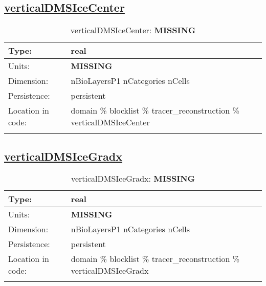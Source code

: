 \subsection[verticalDMSIceCenter]{\hyperref[sec:var_tab_tracer_reconstruction]{verticalDMSIceCenter}}
\label{subsec:var_sec_tracer_reconstruction_verticalDMSIceCenter}
\begin{center}
\begin{longtable}{| p{2.0in} | p{4.0in} |}
        \hline 
        Type: & real \\
        \hline 
        Units: & {\bf \color{red} MISSING} \\
        \hline 
        Dimension: & nBioLayersP1 nCategories nCells \\
        \hline 
        Persistence: & persistent \\
        \hline 
         Location in code: & domain \% blocklist \% tracer\_reconstruction \% verticalDMSIceCenter \\
         \hline 
    \caption{verticalDMSIceCenter: {\bf \color{red} MISSING}}
\end{longtable}
\end{center}
\subsection[verticalDMSIceGradx]{\hyperref[sec:var_tab_tracer_reconstruction]{verticalDMSIceGradx}}
\label{subsec:var_sec_tracer_reconstruction_verticalDMSIceGradx}
\begin{center}
\begin{longtable}{| p{2.0in} | p{4.0in} |}
        \hline 
        Type: & real \\
        \hline 
        Units: & {\bf \color{red} MISSING} \\
        \hline 
        Dimension: & nBioLayersP1 nCategories nCells \\
        \hline 
        Persistence: & persistent \\
        \hline 
         Location in code: & domain \% blocklist \% tracer\_reconstruction \% verticalDMSIceGradx \\
         \hline 
    \caption{verticalDMSIceGradx: {\bf \color{red} MISSING}}
\end{longtable}
\end{center}
